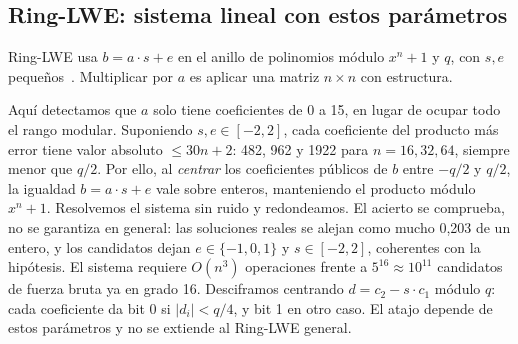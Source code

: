 \subsection{Ring-LWE: sistema lineal con estos parámetros}
\label{sec:ring}
Ring-LWE usa $b=a\cdot s+e$ en el anillo de polinomios módulo $x^n+1$ y $q$, con $s,e$
pequeños~\cite{lpr,tema11}. Multiplicar por $a$ es aplicar una matriz $n\times n$ con estructura.

Aquí detectamos que $a$ solo tiene coeficientes de 0 a 15, en lugar de ocupar todo el rango
modular. Suponiendo $s,e\in[-2,2]$, cada coeficiente del producto más error tiene valor absoluto
$\le30n+2$: 482, 962 y 1922 para $n=16,32,64$, siempre menor que $q/2$.
Por ello, al \emph{centrar} los coeficientes públicos de $b$ entre $-q/2$ y $q/2$, la igualdad
$b=a\cdot s+e$ vale sobre enteros, manteniendo el producto módulo $x^n+1$.
Resolvemos el sistema sin ruido y redondeamos. El acierto se comprueba, no se garantiza en
general: las soluciones reales se alejan como mucho 0{,}203 de un entero, y los candidatos dejan
$e\in\{-1,0,1\}$ y $s\in[-2,2]$, coherentes con la hipótesis. El sistema requiere $O(n^3)$
operaciones frente a $5^{16}\approx10^{11}$ candidatos de fuerza bruta ya en grado 16.
Desciframos centrando $d=c_2-s\cdot c_1$ módulo $q$: cada coeficiente da bit 0 si $|d_i|<q/4$,
y bit 1 en otro caso. El atajo depende de estos parámetros y no se extiende al Ring-LWE general.
